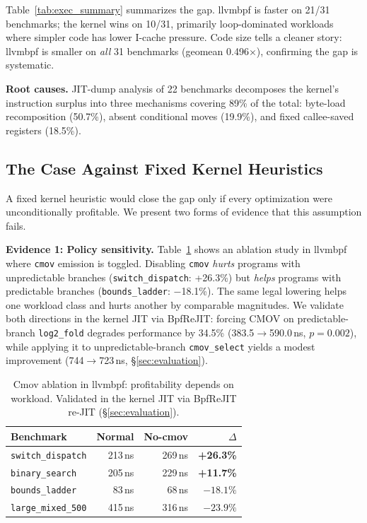 \documentclass[sigconf,anonymous]{acmart}
\begin{document}
Table~\ref{tab:exec_summary} summarizes the gap. llvmbpf is faster on
21/31 benchmarks; the kernel wins on 10/31, primarily loop-dominated
workloads where simpler code has lower I-cache pressure. Code size tells
a cleaner story: llvmbpf is smaller on \emph{all} 31 benchmarks (geomean
0.496$\times$), confirming the gap is systematic.

\textbf{Root causes.} JIT-dump analysis of 22 benchmarks decomposes the
kernel's instruction surplus into three mechanisms covering 89\% of the
total: byte-load recomposition (50.7\%), absent conditional moves
(19.9\%), and fixed callee-saved registers (18.5\%).

\subsection{The Case Against Fixed Kernel Heuristics}
\label{sec:policy_sensitivity}

A fixed kernel heuristic would close the gap only if every optimization
were unconditionally profitable. We present two forms of evidence that
this assumption fails.

\textbf{Evidence 1: Policy sensitivity.}
Table~\ref{tab:cmov_ablation} shows an ablation study in llvmbpf where
\texttt{cmov} emission is toggled. Disabling \texttt{cmov}
\emph{hurts} programs with unpredictable branches
(\texttt{switch\_dispatch}: +26.3\%) but \emph{helps} programs with
predictable branches (\texttt{bounds\_ladder}: $-$18.1\%). The same
legal lowering helps one workload class and hurts another by comparable
magnitudes. We validate both directions in the kernel JIT via BpfReJIT: forcing
CMOV on predictable-branch \texttt{log2\_fold} degrades performance by
34.5\% (383.5$\to$590.0\,ns, $p{=}0.002$), while applying it to
unpredictable-branch \texttt{cmov\_select} yields a modest improvement
(744$\to$723\,ns, \S\ref{sec:evaluation}).

\begin{table}[t]
  \centering
  \caption{Cmov ablation in llvmbpf: profitability depends on workload.
  Validated in the kernel JIT via BpfReJIT re-JIT (\S\ref{sec:evaluation}).}
  \label{tab:cmov_ablation}
  \begin{tabular}{lrrr}
    \toprule
    Benchmark & Normal & No-cmov & $\Delta$ \\
    \midrule
    \texttt{switch\_dispatch}  & 213\,ns & 269\,ns & \textbf{+26.3\%} \\
    \texttt{binary\_search}    & 205\,ns & 229\,ns & \textbf{+11.7\%} \\
    \texttt{bounds\_ladder}    & 83\,ns  & 68\,ns  & $-18.1\%$ \\
    \texttt{large\_mixed\_500} & 415\,ns & 316\,ns & $-23.9\%$ \\
    \bottomrule
  \end{tabular}
\end{table}
\end{document}
